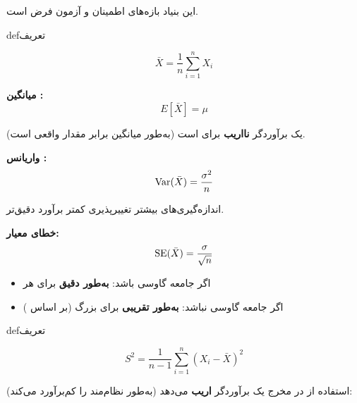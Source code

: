 این بنیاد بازه‌های اطمینان و آزمون فرض است.


\begin{PSbox}[unbreakable]{def}{تعریف}

\[\bar{X} = \frac{1}{n}\sum_{i=1}^n X_i\]

\end{PSbox}


\textbf{میانگین :}\PSbr{}\[E[\bar{X}] = \mu\]

 یک برآوردگر \textbf{نااریب} برای \lr{\ensuremath{\mu}} است (به‌طور میانگین برابر مقدار واقعی است).

\textbf{واریانس :}\PSbr{}\[\text{Var}(\bar{X}) = \frac{\sigma^2}{n}\]

اندازه‌گیری‌های بیشتر \lr{\ensuremath{\to}} تغییرپذیری کمتر \lr{\ensuremath{\to}} برآورد دقیق‌تر.

\textbf{خطای معیار:}\PSbr{}\[\text{SE}(\bar{X}) = \frac{\sigma}{\sqrt{n}}\]


\begin{itemize}
\tightlist
\item
  اگر جامعه گاوسی باشد:  \textbf{به‌طور دقیق} برای هر 
\item
  اگر جامعه گاوسی نباشد:  \textbf{به‌طور تقریبی} برای  بزرگ (بر اساس )
\end{itemize}


\begin{PSbox}[unbreakable]{def}{تعریف}

\[S^2 = \frac{1}{n-1}\sum_{i=1}^n (X_i - \bar{X})^2\]

\end{PSbox}


استفاده از  در مخرج یک برآوردگر \textbf{اریب} می‌دهد (به‌طور نظام‌مند  را کم‌برآورد می‌کند):

